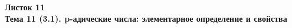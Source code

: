 \documentclass[a4paper, 11pt]{article}
\begin{document}
\begin{center} \Large \bf Листок 11\\ Тема 11 (3.1). p-адические числа: элементарное определение и свойства \end{center}


\end{document}

